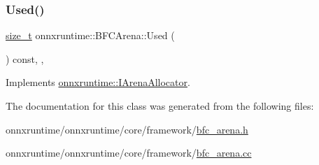 \subsubsection{\texorpdfstring{Used()}{Used()}}
{\footnotesize\ttfamily \mbox{\hyperlink{mlasi_8h_a503efbc1c6e50825320ad909366b78ab}{size\+\_\+t}} onnxruntime\+::\+B\+F\+C\+Arena\+::\+Used (\begin{DoxyParamCaption}{ }\end{DoxyParamCaption}) const\hspace{0.3cm}{\ttfamily [inline]}, {\ttfamily [override]}, {\ttfamily [virtual]}}



Implements \mbox{\hyperlink{classonnxruntime_1_1IArenaAllocator_aa6b6994640f86749998ffd0c5da4dd83}{onnxruntime\+::\+I\+Arena\+Allocator}}.



The documentation for this class was generated from the following files\+:\begin{DoxyCompactItemize}
\item 
onnxruntime/onnxruntime/core/framework/\mbox{\hyperlink{bfc__arena_8h}{bfc\+\_\+arena.\+h}}\item 
onnxruntime/onnxruntime/core/framework/\mbox{\hyperlink{bfc__arena_8cc}{bfc\+\_\+arena.\+cc}}\end{DoxyCompactItemize}

